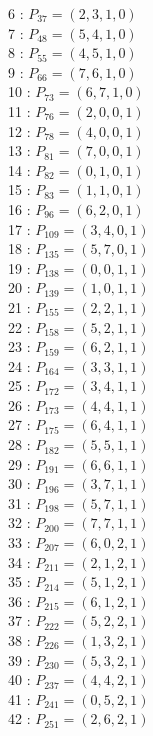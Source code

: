 \documentclass{article}
\begin{document}
{\begin{multicols}{3}
6 : $P_{37}=( 2, 3, 1, 0 )$\\
7 : $P_{48}=( 5, 4, 1, 0 )$\\
8 : $P_{55}=( 4, 5, 1, 0 )$\\
9 : $P_{66}=( 7, 6, 1, 0 )$\\
10 : $P_{73}=( 6, 7, 1, 0 )$\\
11 : $P_{76}=( 2, 0, 0, 1 )$\\
12 : $P_{78}=( 4, 0, 0, 1 )$\\
13 : $P_{81}=( 7, 0, 0, 1 )$\\
14 : $P_{82}=( 0, 1, 0, 1 )$\\
15 : $P_{83}=( 1, 1, 0, 1 )$\\
16 : $P_{96}=( 6, 2, 0, 1 )$\\
17 : $P_{109}=( 3, 4, 0, 1 )$\\
18 : $P_{135}=( 5, 7, 0, 1 )$\\
19 : $P_{138}=( 0, 0, 1, 1 )$\\
20 : $P_{139}=( 1, 0, 1, 1 )$\\
21 : $P_{155}=( 2, 2, 1, 1 )$\\
22 : $P_{158}=( 5, 2, 1, 1 )$\\
23 : $P_{159}=( 6, 2, 1, 1 )$\\
24 : $P_{164}=( 3, 3, 1, 1 )$\\
25 : $P_{172}=( 3, 4, 1, 1 )$\\
26 : $P_{173}=( 4, 4, 1, 1 )$\\
27 : $P_{175}=( 6, 4, 1, 1 )$\\
28 : $P_{182}=( 5, 5, 1, 1 )$\\
29 : $P_{191}=( 6, 6, 1, 1 )$\\
30 : $P_{196}=( 3, 7, 1, 1 )$\\
31 : $P_{198}=( 5, 7, 1, 1 )$\\
32 : $P_{200}=( 7, 7, 1, 1 )$\\
33 : $P_{207}=( 6, 0, 2, 1 )$\\
34 : $P_{211}=( 2, 1, 2, 1 )$\\
35 : $P_{214}=( 5, 1, 2, 1 )$\\
36 : $P_{215}=( 6, 1, 2, 1 )$\\
37 : $P_{222}=( 5, 2, 2, 1 )$\\
38 : $P_{226}=( 1, 3, 2, 1 )$\\
39 : $P_{230}=( 5, 3, 2, 1 )$\\
40 : $P_{237}=( 4, 4, 2, 1 )$\\
41 : $P_{241}=( 0, 5, 2, 1 )$\\
42 : $P_{251}=( 2, 6, 2, 1 )$\\

\end{multicols}}
\end{document}
